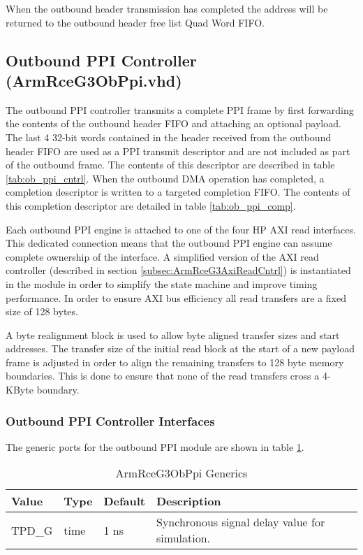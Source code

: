 \documentclass[11pt]{article}
\begin{document}
When the outbound header transmission has completed the address will be returned to the outbound header free list Quad Word FIFO.

\subsection{Outbound PPI Controller (ArmRceG3ObPpi.vhd)}
\label{subsec:ArmRceG3ObPpi}

The outbound PPI controller transmits a complete PPI frame by first forwarding the contents of the outbound header FIFO and attaching an optional
payload. The last 4 32-bit words contained in the header received from the outbound header FIFO are used as a PPI transmit descriptor and are
not included as part of the outbound frame. The contents of this descriptor are described in table \ref{tab:ob_ppi_cntrl}.
When the outbound DMA operation has completed, a completion descriptor is written to a targeted completion FIFO. The contents of this completion 
descriptor are detailed in table \ref{tab:ob_ppi_comp}.

Each outbound PPI engine is attached to one of the four HP AXI read interfaces. This dedicated connection means that the outbound PPI engine
can assume complete ownership of the interface. A simplified version of the AXI read controller (described in section \ref{subsec:ArmRceG3AxiReadCntrl})
is instantiated in the module in order to simplify the state machine and improve timing performance. In order to ensure AXI bus efficiency all read 
transfers are a fixed size of 128 bytes.

A byte realignment block is used to allow byte aligned transfer sizes and start addresses. The transfer size of the initial read block at the start 
of a new payload frame is adjusted in order to align the remaining transfers to 128 byte memory boundaries. This is done to ensure that none of the read 
transfers cross a 4-KByte boundary.

\subsubsection{Outbound PPI Controller Interfaces}

The generic ports for the outbound PPI module are shown in table \ref{tab:ob_ppi_generics}.

\begin{table}[H]
\small
\centering
   \begin{tabular}{| l | l | l | l | }
      \hline \textbf{Value} & \textbf{Type} & \textbf{Default} & \textbf{Description} \\
      \hline TPD\_G          & time     & 1 ns & Synchronous signal delay value for simulation.    \\
      \hline
   \end{tabular}
   \caption{ArmRceG3ObPpi Generics}
   \label{tab:ob_ppi_generics}
\end{table}
\end{document}
